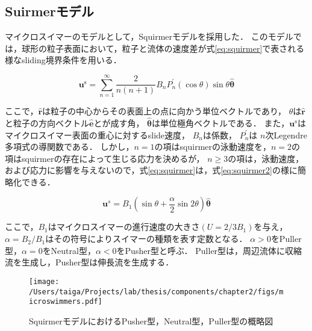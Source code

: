 \subsection{Suirmerモデル}
マイクロスイマーのモデルとして，Squirmerモデル\cite{}を採用した．
このモデルでは，球形の粒子表面において，粒子と流体の速度差が式\eqref{eq:squirmer}で表される様なsliding境界条件を用いる．

    \begin{equation}
        \boldsymbol{u}^\mathrm{s} = 
            \sum_{n=1}^\infty\frac{2}{n(n + 1)} B_n P_n^\prime(\cos{\theta}) \sin{\theta} \hat{\boldsymbol{\theta}}
        \label{eq:squirmer}
    \end{equation}

\noindent
ここで，$\boldsymbol{\hat{r}}$は粒子の中心からその表面上の点に向かう単位ベクトルであり，
$\theta$は$\boldsymbol{\hat{r}}$と粒子の方向ベクトル$\boldsymbol{\hat{e}}$とが成す角，
$\boldsymbol{\hat{\theta}}$は単位極角ベクトルである．
また，$\boldsymbol{u}^\mathrm{s}$はマイクロスイマー表面の重心に対するslide速度，
$B_n$は係数，
$P^\prime_n$は $n$次Legendre多項式の導関数である．
しかし，$n=1$の項はsquirmerの泳動速度を，$n=2$の項はsquirmerの存在によって生じる応力を決めるが，
$n \geq 3$の項は，泳動速度，および応力に影響を与えないので，式\eqref{eq:squirmer}は，式\eqref{eq:squirmer2}の様に簡略化できる．

    \begin{equation}
        \boldsymbol{u}^s =
            B_1\left(\sin{\theta} + \frac{\alpha}{2}\sin{2\theta}\right)\hat{\boldsymbol{\theta}}
        \label{eq:squirmer2}
    \end{equation}

\noindent
ここで，$B_1$はマイクロスイマーの進行速度の大きさ$(U = 2/3 B_1)$を与え，$\alpha = B_2/B_1$はその符号によりスイマーの種類を表す定数となる．
$\alpha > 0$をPuller型，$\alpha = 0$をNeutral型，$\alpha < 0$をPusher型と呼ぶ．
Puller型は，周辺流体に収縮流を生成し，Pusher型は伸長流を生成する．

    \begin{figure}[htbp]
        \centering
        \texttt{[image: /Users/taiga/Projects/lab/thesis/components/chapter2/figs/microswimmers.pdf]}
        \caption{SquirmerモデルにおけるPusher型，Neutral型，Puller型の概略図}
        \label{fig:squirmer_flow}
    \end{figure}

